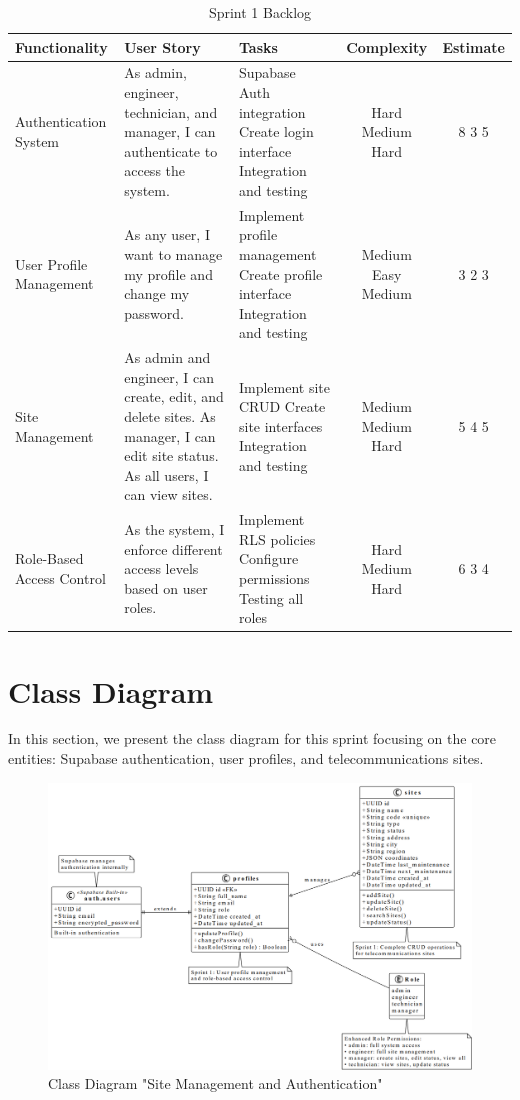 \begin{table}[H]
\centering
\small
\begin{tabular}{|p{2.8cm}|p{4.5cm}|p{3cm}|c|c|}
\hline
\textbf{Functionality} & \textbf{User Story} & \textbf{Tasks} & \textbf{Complexity} & \textbf{Estimate} \\
\hline
Authentication System & 
As admin, engineer, technician, and manager, I can authenticate to access the system.
& 
Supabase Auth integration
Create login interface  
Integration and testing
& 
Hard
Medium  
Hard
& 
8
3
5 \\
\hline
User Profile Management & 
As any user, I want to manage my profile and change my password.
& 
Implement profile management
Create profile interface
Integration and testing
& 
Medium
Easy
Medium
& 
3
2
3 \\
\hline
Site Management & 
As admin and engineer, I can create, edit, and delete sites.
As manager, I can edit site status.
As all users, I can view sites.
& 
Implement site CRUD
Create site interfaces
Integration and testing
& 
Medium
Medium
Hard
& 
5
4
5 \\
\hline
Role-Based Access Control & 
As the system, I enforce different access levels based on user roles.
& 
Implement RLS policies
Configure permissions
Testing all roles
& 
Hard
Medium
Hard
& 
6
3
4 \\
\hline
\end{tabular}
\caption{Sprint 1 Backlog}
\label{tab:sprint1_backlog}
\end{table}

\section{Class Diagram}

In this section, we present the class diagram for this sprint focusing on the core entities: Supabase authentication, user profiles, and telecommunications sites.

\begin{figure}[H]
    \centering
    \includegraphics[width=0.95\linewidth]{img/chap_03/class_diagram_sprint1.png}
    \caption{Class Diagram "Site Management and Authentication"}
    \label{fig:class_diagram_sprint1}
\end{figure}

